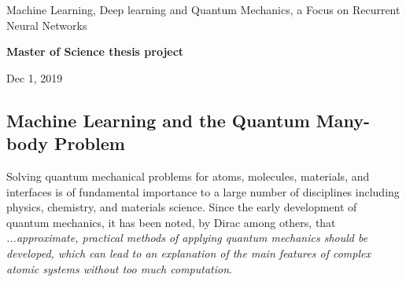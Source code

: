 \documentclass[%
oneside,                 %
final,                   %
10pt]{article}
\begin{document}

\newcommand{\exercisesection}[1]{\subsection*{#1}}






\thispagestyle{empty}

\begin{center}
{\LARGE\bf
\begin{spacing}{1.25}
Machine Learning, Deep learning and Quantum Mechanics, a Focus on Recurrent Neural Networks
\end{spacing}
}
\end{center}


\begin{center}
{\bf Master of Science thesis project${}^{}$} \\ [0mm]
\end{center}

\begin{center}
\end{center}
    

\begin{center}
Dec 1, 2019
\end{center}

\vspace{1cm}


\subsection*{Machine Learning and the Quantum Many-body Problem}

Solving quantum mechanical problems for atoms,  molecules, materials, and
interfaces is of fundamental importance to a large number of
disciplines including physics, chemistry, and materials science. Since
the early development of quantum mechanics, it has been noted, by
Dirac among others, that \emph{...approximate, practical methods of applying quantum mechanics should be developed, which can lead to an explanation of the main features of complex atomic systems without too much computation}. 
\end{document}
